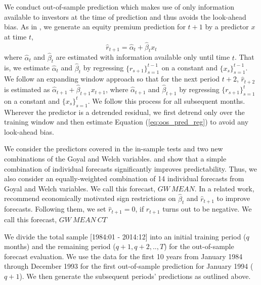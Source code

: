 We conduct out-of-sample prediction which makes use of only information available to investors at the time of prediction and thus avoids the look-ahead bias. As in \cite{Welch2008}, we generate an equity premium prediction for $t+1$ by a predictor $x$ at time $t$, \vspace{-0.3cm}
\begin{equation} \label{eq:oos_pred_reg}
\hat r_{t+1} = \hat \alpha_{t} + \hat \beta_{t}x_{t}
\end{equation}
where $\hat \alpha_{t}$ and $\hat \beta_{t}$ are estimated with
information available only until time $t$. That is, we estimate
$\hat \alpha_{t}$ and $\hat \beta_{t}$ by regressing
$\{r_{s+1}\}_{s=1}^{t-1}$ on a constant and
$\{x_{s}\}_{s=1}^{t-1}$. We follow an expanding window approach so
that for the next period $t+2$, $\hat r_{t+2}$ is estimated as
$\hat \alpha_{t+1} + \hat \beta_{t+1}x_{t+1}$, where $\hat
\alpha_{t+1}$ and $\hat \beta_{t+1}$ by regressing
$\{r_{s+1}\}_{s=1}^{t}$ on a constant and $\{x_{s}\}_{s=1}^{t}$.
We follow this process for all subsequent months. Wherever the predictor is a detrended residual, we first detrend only over the training window and then estimate Equation (\ref{eq:oos_pred_reg}) to avoid any look-ahead bias.

We consider the predictors covered in the in-sample tests and
two new combinations of the Goyal and Welch variables.
\cite{Timmermann2006} and \cite{Rapach2010} show that a simple
combination of individual forecasts significantly improves
predictability. Thus, we also consider an equally-weighted
combination of 14 individual forecasts from Goyal and Welch
variables. We call this forecast, $GW\:MEAN$. In a related work,
\cite{Campbell2008} recommend economically motivated sign
restrictions on $\hat \beta_{t}$ and $\hat r_{t+1}$  to improve
forecasts. Following them, we set $\hat
r_{t+1} = 0$, if $\hat r_{t+1}$ turns out to be negative. We call this forecast, $GW\:MEAN\:CT$

We divide the total sample [1984:01 - 2014:12] into an
initial training period ($q$ months) and the remaining period
($q+1, q+2,..,T$) for the out-of-sample forecast evaluation. We
use the data for the first 10 years from January 1984 through
December 1993 for the first out-of-sample prediction for January
1994 ($q+1$). We then generate the subsequent periods'
predictions as outlined above.

